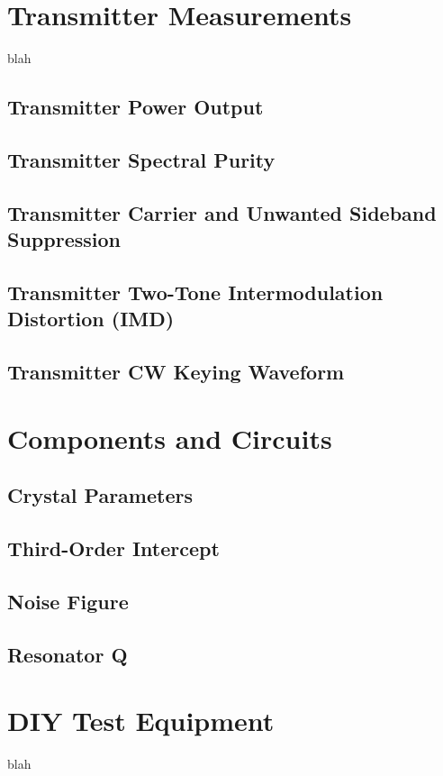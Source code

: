 \documentclass[10pt,letterpaper]{book}
\begin{document}
\chapter{Transmitter Measurements}
blah
\section{Transmitter Power Output}
\section{Transmitter Spectral Purity}
\section{Transmitter Carrier and Unwanted Sideband Suppression}
\section{Transmitter Two-Tone Intermodulation Distortion (IMD)}
\section{Transmitter CW Keying Waveform}
\chapter{Components and Circuits}

\section{Crystal Parameters}
\section{Third-Order Intercept}
\section{Noise Figure}
\section{Resonator Q}
\chapter{DIY Test Equipment}
blah
\end{document}
